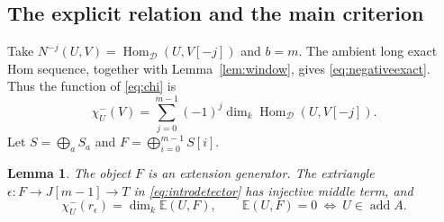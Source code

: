 \documentclass[pdflatex,sn-mathphys-num]{sn-jnl}
\numberwithin{equation}{section}
\newtheorem{lemma}[theorem]{Lemma}
\theoremstyle{definition}
\theoremstyle{remark}\newtheorem{remark}[theorem]{Remark}
\newcommand{\D}{\mathcal D}
\newcommand{\E}{\mathbb E}
\newcommand{\Hom}{\operatorname{Hom}}
\newcommand{\add}{\operatorname{add}}
\newcommand{\dimk}{\dim_k}
\begin{document}
\subsection{The explicit relation and the main criterion}
Take $N^{-j}(U,V)=\Hom_{\D}(U,V[-j])$ and $b=m$. The ambient
long exact Hom sequence, together with Lemma~\ref{lem:window}, gives
\eqref{eq:negativeexact}. Thus the function of \eqref{eq:chi} is
\[
 \chi^-_U(V)=\sum_{j=0}^{m-1}(-1)^j\dimk\Hom_{\D}(U,V[-j]).
\]
Let $S=\bigoplus_aS_a$ and $F=\bigoplus_{i=0}^{m-1}S[i]$.

\begin{lemma}\label{lem:detector}
The object $F$ is an extension generator. The extriangle
$\epsilon:F\to J[m-1]\to T$ in \eqref{eq:introdetector} has injective
middle term, and
\[
 \chi^-_U(r_\epsilon)=\dimk\E(U,F),\qquad
 \E(U,F)=0\ \Longleftrightarrow\ U\in\add A.
\]
\end{lemma}
\end{document}
